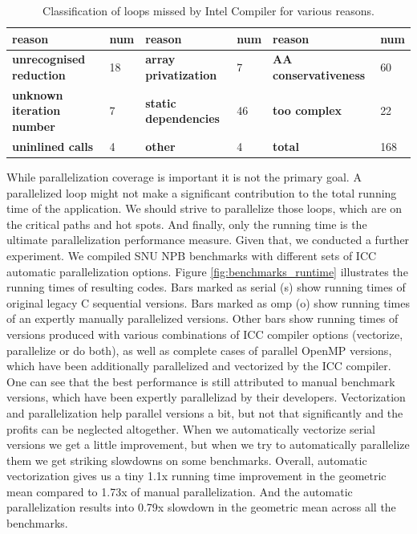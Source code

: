 \begin{table}
  \begin{minipage}{\pagewidth}
  \begin{center}
    \begin{tabu}{M{3.0cm}M{1.0cm}M{3.0cm}M{1.0cm}M{3.0cm}M{1.0cm}}
      \hline
      \rowfont{\bfseries}
      reason & num & reason & num & reason & num\\\hline
      \textbf{unrecognised reduction} & 18 & \textbf{array privatization} & 7 & \textbf{AA conservativeness} & 60\\\hline
      \textbf{unknown iteration number} & 7 & \textbf{static dependencies} & 46 & \textbf{too complex} & 22\\\hline
      \textbf{uninlined calls} & 4 & \textbf{other} & 4 & \textbf{total} & 168\\\hline
    \end{tabu}
  \end{center}
  \end{minipage}
  \caption{Classification of loops missed by Intel Compiler for various reasons.}
  \label{tab:icc_missed_opportunities}
\end{table}\newline\null
\quad While parallelization coverage is important it is not the primary goal. A parallelized loop might not make a significant contribution to the total running time of the application. We should strive to parallelize those loops, which are on the critical paths and hot spots. And finally, only the running time is the ultimate parallelization performance measure. Given that, we conducted a further experiment. We compiled SNU NPB benchmarks with different sets of ICC automatic parallelization options. Figure \ref{fig:benchmarks_runtime} illustrates the running times of resulting codes. Bars marked as serial (s) show running times of original legacy C sequential versions. Bars marked as omp (o) show running times of an expertly manually parallelized versions. Other bars show running times of versions produced with various combinations of ICC compiler options (vectorize, parallelize or do both), as well as complete cases of parallel OpenMP versions, which have been additionally parallelized and vectorized by the ICC compiler. One can see that the best performance is still attributed to manual benchmark versions, which have been expertly parallelizad by their developers. Vectorization and parallelization help parallel versions a bit, but not that significantly and the profits can be neglected altogether. When we automatically vectorize serial versions we get a little improvement, but when we try to automatically parallelize them we get striking slowdowns on some benchmarks. Overall, automatic vectorization gives us a tiny 1.1x running time improvement in the geometric mean compared to 1.73x of manual parallelization. And the automatic parallelization results into 0.79x slowdown in the geometric mean across all the benchmarks.\newline\null
